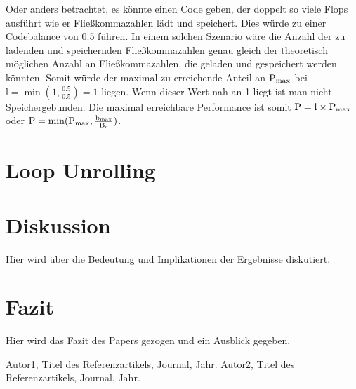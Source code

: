 \documentclass{article}
\begin{document}
    Oder anders betrachtet, es könnte einen Code geben,
    der doppelt so viele Flops ausführt wie er Fließkommazahlen lädt und speichert. 
    Dies würde zu einer Codebalance von 0.5 führen. 
    In einem solchen Szenario wäre die Anzahl 
    der zu ladenden und speichernden Fließkommazahlen genau gleich der theoretisch möglichen Anzahl
    an Fließkommazahlen, die geladen und gespeichert werden könnten. 
    Somit würde der maximal zu erreichende Anteil an 
    $\textnormal{P}_{\textnormal{max}}$ bei $\text{l} = \min(1, \frac{0.5}{0.5}) = 1$ liegen.  %
    Wenn dieser Wert nah an 1 liegt ist man nicht Speichergebunden.
    Die maximal erreichbare Performance ist somit $\textnormal{P} =  \textnormal{l} \times \textnormal{P}_{\textnormal{max}}$ oder 
    $\textnormal{P} =  \min(\textnormal{P}_{\textnormal{max}}, \frac{\textnormal{b}_{\textnormal{max}}}{\textnormal{B}_{\textnormal{c}}})$.

\section{Loop Unrolling}


\section{Diskussion}
Hier wird über die Bedeutung und Implikationen der Ergebnisse diskutiert.

\section{Fazit}
Hier wird das Fazit des Papers gezogen und ein Ausblick gegeben.

\begin{thebibliography}{9}
 Autor1, Titel des Referenzartikels, Journal, Jahr.
 Autor2, Titel des Referenzartikels, Journal, Jahr.
\end{thebibliography}
\end{document}
